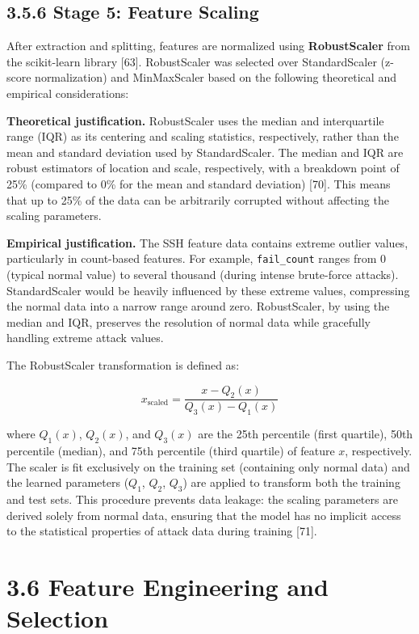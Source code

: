 \documentclass[
  a4paper]{report}
\begin{document}
\subsection{3.5.6 Stage 5: Feature
Scaling}\label{stage-5-feature-scaling}

After extraction and splitting, features are normalized using
\textbf{RobustScaler} from the scikit-learn library {[}63{]}.
RobustScaler was selected over StandardScaler (z-score normalization)
and MinMaxScaler based on the following theoretical and empirical
considerations:

\textbf{Theoretical justification.} RobustScaler uses the median and
interquartile range (IQR) as its centering and scaling statistics,
respectively, rather than the mean and standard deviation used by
StandardScaler. The median and IQR are robust estimators of location and
scale, respectively, with a breakdown point of 25\% (compared to 0\% for
the mean and standard deviation) {[}70{]}. This means that up to 25\% of
the data can be arbitrarily corrupted without affecting the scaling
parameters.

\textbf{Empirical justification.} The SSH feature data contains extreme
outlier values, particularly in count-based features. For example,
\texttt{fail\_count} ranges from 0 (typical normal value) to several
thousand (during intense brute-force attacks). StandardScaler would be
heavily influenced by these extreme values, compressing the normal data
into a narrow range around zero. RobustScaler, by using the median and
IQR, preserves the resolution of normal data while gracefully handling
extreme attack values.

The RobustScaler transformation is defined as:

\[x_{\text{scaled}} = \frac{x - Q_2(x)}{Q_3(x) - Q_1(x)}\]

where \(Q_1(x)\), \(Q_2(x)\), and \(Q_3(x)\) are the 25th percentile
(first quartile), 50th percentile (median), and 75th percentile (third
quartile) of feature \(x\), respectively. The scaler is fit exclusively
on the training set (containing only normal data) and the learned
parameters (\(Q_1\), \(Q_2\), \(Q_3\)) are applied to transform both the
training and test sets. This procedure prevents data leakage: the
scaling parameters are derived solely from normal data, ensuring that
the model has no implicit access to the statistical properties of attack
data during training {[}71{]}.

\section{3.6 Feature Engineering and
Selection}\label{feature-engineering-and-selection}
\end{document}
